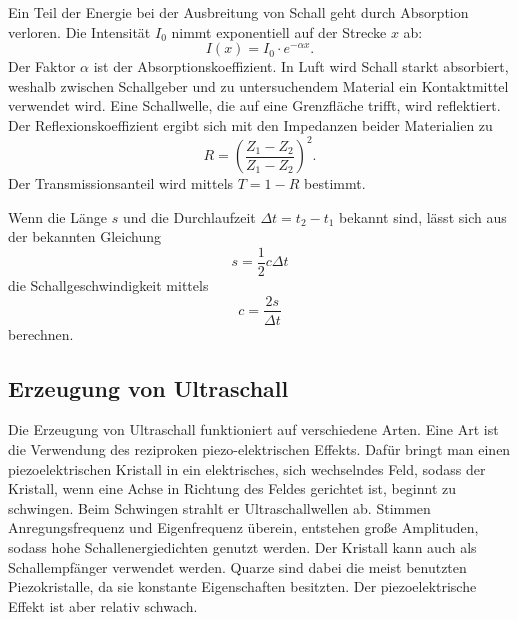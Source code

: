 \noindent Ein Teil der Energie bei der Ausbreitung von Schall geht 
durch Absorption verloren. Die Intensität $I_0$ nimmt 
exponentiell auf der Strecke $x$ ab:
\begin{equation}
    I(x)= I_0 \cdot e^{-\alpha x}.
    \label{eqn:I}
\end{equation}
Der Faktor $\alpha$ 
ist der Absorptionskoeffizient.
In Luft wird Schall starkt absorbiert, weshalb zwischen 
Schallgeber und zu untersuchendem Material ein Kontaktmittel 
verwendet wird.
\newline
Eine Schallwelle, die auf eine Grenzfläche trifft, wird 
reflektiert. Der Reflexionskoeffizient ergibt sich mit den 
Impedanzen beider Materialien zu 
\begin{equation*}
    R = (\frac{Z_1-Z_2}{Z_1-Z_2})^2. %
\end{equation*}
Der Transmissionsanteil wird mittels $T= 1-R$ bestimmt.

\noindent Wenn die Länge $s$ und die Durchlaufzeit $\Delta t = t_2 - t_1$
bekannt sind, lässt sich aus der bekannten Gleichung
\begin{equation}
    s=\frac{1}{2}c \Delta t
    \label{eqn:s}
\end{equation}
die Schallgeschwindigkeit mittels
\begin{equation}
    c = \frac{2 s}{\Delta t}
    \label{eqn:c}
\end{equation}
berechnen.

\subsection{Erzeugung von Ultraschall}
\noindent Die Erzeugung von Ultraschall funktioniert auf verschiedene 
Arten. Eine Art ist die Verwendung des reziproken 
piezo-elektrischen Effekts. Dafür bringt man einen 
piezoelektrischen Kristall in ein elektrisches, sich
wechselndes Feld, sodass der Kristall, wenn eine Achse in 
Richtung des Feldes gerichtet ist, beginnt zu 
schwingen. Beim Schwingen strahlt er Ultraschallwellen ab. 
Stimmen Anregungsfrequenz und Eigenfrequenz überein, 
entstehen große Amplituden, sodass hohe Schallenergiedichten 
genutzt werden. Der Kristall kann auch als Schallempfänger 
verwendet werden. Quarze sind dabei die meist benutzten 
Piezokristalle, da sie konstante Eigenschaften besitzten. 
Der piezoelektrische Effekt ist aber relativ schwach. 

